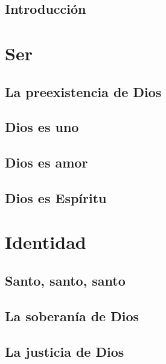 \chapter*{Introducción}
\setcounter{section}{0}

\renewcommand{\thesection}{\thechapter.\arabic{section}}
\part{Ser}
\chapter[Preexistente]{La preexistencia de Dios}

\chapter[Uno]{Dios es uno}

\chapter[Amor]{Dios es amor}

\chapter[Espíritu]{Dios es Espíritu}

\part{Identidad}
\chapter[Santo]{Santo, santo, santo}

\chapter[Soberano]{La soberanía de Dios}

\chapter[Justo]{La justicia de Dios}

